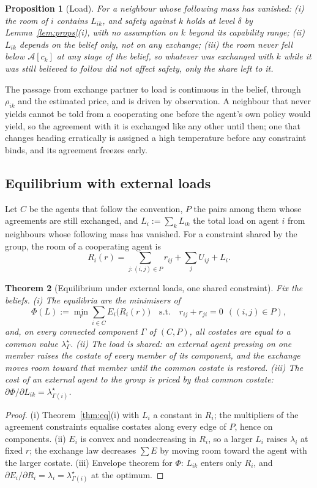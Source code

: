 \documentclass[11pt]{article}
\newtheorem{theorem}{Theorem}[section]
\newtheorem{proposition}[theorem]{Proposition}
\theoremstyle{definition}
\theoremstyle{remark}
\newcommand{\A}{\mathcal{A}}
\begin{document}
\begin{proposition}[Load]\label{prop:load}
For a neighbour whose following mass has vanished: (i) the room of $i$ contains $L_{ik}$, and safety against $k$ holds at level $\delta$ by Lemma~\ref{lem:props}(i), with no assumption on $k$ beyond its capability range; (ii) $L_{ik}$ depends on the belief only, not on any exchange; (iii) the room never fell below $\A[c_k]$ at any stage of the belief, so whatever was exchanged with $k$ while it was still believed to follow did not affect safety, only the share left to it.
\end{proposition}

The passage from exchange partner to load is continuous in the belief, through $\rho_{ik}$ and the estimated price, and is driven by observation. A neighbour that never yields cannot be told from a cooperating one before the agent's own policy would yield, so the agreement with it is exchanged like any other until then; one that changes heading erratically is assigned a high temperature before any constraint binds, and its agreement freezes early.

\subsection{Equilibrium with external loads}
Let $C$ be the agents that follow the convention, $P$ the pairs among them whose agreements are still exchanged, and $L_i:=\sum_kL_{ik}$ the total load on agent $i$ from neighbours whose following mass has vanished. For a constraint shared by the group, the room of a cooperating agent is
\[
R_i(r)=\sum_{j:(i,j)\in P}r_{ij}+\sum_jU_{ij}+L_i .
\]

\begin{theorem}[Equilibrium under external loads, one shared constraint]\label{thm:load}
Fix the beliefs. (i) The equilibria are the minimisers of
\[
\Phi(L):=\min_r\sum_{i\in C}E_i\big(R_i(r)\big)\quad\text{s.t.}\quad r_{ij}+r_{ji}=0\ \ ((i,j)\in P),
\]
and, on every connected component $\Gamma$ of $(C,P)$, all costates are equal to a common value $\lambda^\star_\Gamma$. (ii) The load is shared: an external agent pressing on one member raises the costate of every member of its component, and the exchange moves room toward that member until the common costate is restored. (iii) The cost of an external agent to the group is priced by that common costate: $\partial\Phi/\partial L_{ik}=\lambda^\star_{\Gamma(i)}$.
\end{theorem}
\begin{proof}
(i) Theorem~\ref{thm:eq}(i) with $L_i$ a constant in $R_i$; the multipliers of the agreement constraints equalise costates along every edge of $P$, hence on components. (ii) $E_i$ is convex and nondecreasing in $R_i$, so a larger $L_i$ raises $\lambda_i$ at fixed $r$; the exchange law decreases $\sum E$ by moving room toward the agent with the larger costate. (iii) Envelope theorem for $\Phi$: $L_{ik}$ enters only $R_i$, and $\partial E_i/\partial R_i=\lambda_i=\lambda^\star_{\Gamma(i)}$ at the optimum.
\end{proof}
\end{document}
